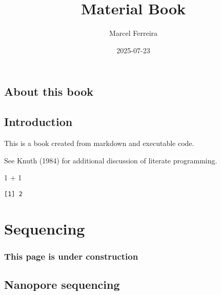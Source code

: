 \documentclass[
  letterpaper,
  DIV=11,
  numbers=noendperiod]{scrreprt}
\title{Material Book}
\author{Marcel Ferreira}
\date{2025-07-23}
\newenvironment{Shaded}{\begin{snugshade}}{\end{snugshade}}
\newcommand{\DecValTok}[1]{\textcolor[rgb]{0.68,0.00,0.00}{#1}}
\newcommand{\SpecialCharTok}[1]{\textcolor[rgb]{0.37,0.37,0.37}{#1}}
\renewcommand*\contentsname{Table of contents}
\newcommand\contentsname{Table of contents}
\begin{document}
\maketitle

\renewcommand*\contentsname{Table of contents}
{
\hypersetup{linkcolor=}
\setcounter{tocdepth}{2}
\tableofcontents
}


\chapter*{About this book}\label{about-this-book}



\chapter{Introduction}\label{introduction}

This is a book created from markdown and executable code.

See Knuth (1984) for additional discussion of literate programming.

\begin{Shaded}
\begin{Highlighting}[]
\DecValTok{1} \SpecialCharTok{+} \DecValTok{1}
\end{Highlighting}
\end{Shaded}

\begin{verbatim}
[1] 2
\end{verbatim}

\part{Sequencing}

\section*{This page is under
construction}\label{this-page-is-under-construction}


\chapter{Nanopore sequencing}\label{sec-nanoseq}
\end{document}

